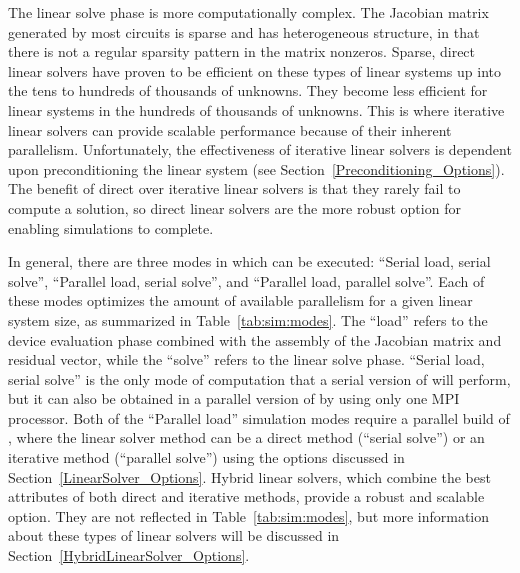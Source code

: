 The linear solve phase is more computationally complex.  The Jacobian matrix generated by most circuits is sparse and has heterogeneous structure, in 
that there is not a regular sparsity pattern in the matrix nonzeros.  Sparse, direct linear solvers have proven to be efficient on these types of 
linear systems up into the tens to hundreds of thousands of unknowns.  They become less efficient for linear systems in the hundreds of thousands of unknowns.  
This is where iterative linear solvers can provide scalable performance because of their inherent parallelism.  Unfortunately, the effectiveness of 
iterative linear solvers is dependent upon preconditioning the linear system (see Section~\ref{Preconditioning_Options}).  
The benefit of direct over iterative linear solvers is that they rarely fail to compute a solution, so direct
linear solvers are the more robust option for enabling simulations to complete.  

In general, there are three modes in which \Xyce{} can
be executed:  ``Serial load, serial solve'', ``Parallel load, serial solve'', and ``Parallel load, parallel solve''.  
Each of these modes optimizes the amount of available parallelism for a given linear system size, as summarized in Table~\ref{tab:sim:modes}.  The ``load'' refers to the device evaluation phase combined with the assembly of the Jacobian matrix and residual vector, while
the ``solve'' refers to the linear solve phase. 
``Serial load, serial solve'' is the only mode of computation that a serial version of \Xyce{} will perform, but it can also be
obtained in a parallel version of \Xyce{} by using only one MPI processor.  Both of the ``Parallel load'' simulation modes require a parallel build of \Xyce{}, where the linear solver method can be a direct method (``serial solve'') or an iterative method (``parallel solve'') using
the options discussed in Section~\ref{LinearSolver_Options}.
Hybrid linear solvers, which combine the best attributes of both direct and iterative methods, provide a robust and scalable option. 
They are not reflected in Table~\ref{tab:sim:modes}, but more information about these types of linear solvers will be discussed in 
Section~\ref{HybridLinearSolver_Options}.  

